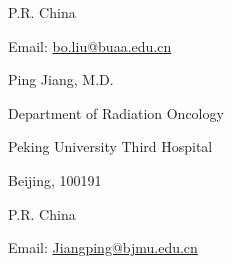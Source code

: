 \documentclass[12pt,twoside,letterpaper]{article}
\begin{document}
P.R. China\par

Email: \href{mailto:bo.liu@buaa.edu.cn}{bo.liu@buaa.edu.cn}\par

\smallskip

Ping Jiang, M.D.\par

Department of Radiation Oncology\par

Peking University Third Hospital\par

Beijing, 100191\par

P.R. China\par

Email: \href{mailto:Jiangping@bjmu.edu.cn}{Jiangping@bjmu.edu.cn}\par

\smallskip

\endgroup

\clearpage

\begingroup\setlength{\parskip}{0.5ex}
\end{document}
